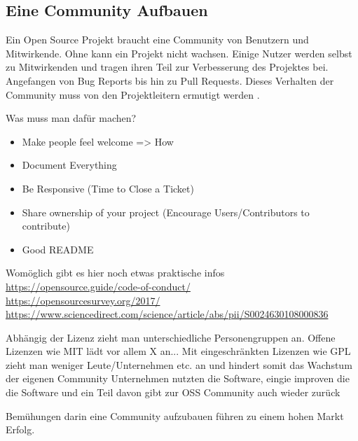 \subsection{Eine Community Aufbauen} \label{ssec:Eine Community Aufbauen}




\noindent
Ein Open Source Projekt braucht eine Community von Benutzern und Mitwirkende. Ohne kann ein Projekt
nicht wachsen. Einige Nutzer werden selbst zu Mitwirkenden und tragen ihren Teil zur Verbesserung
des Projektes bei. Angefangen von Bug Reports bis hin zu Pull Requests. Dieses Verhalten der Community
muss von den Projektleitern ermutigt werden
\cite{bangerthWhatMakesComputational2013,GitHubBuildingWelcomingCommunities2022}.

\bigskip
\noindent
Was muss man dafür machen?

\begin{itemize}
    \item Make people feel welcome => How
    \item Document Everything
    \item Be Responsive (Time to Close a Ticket)
    \item Share ownership of your project (Encourage Users/Contributors to contribute)
    \item Good README
\end{itemize}

\bigskip
\noindent
Womöglich gibt es hier noch etwas praktische infos \\
\url{https://opensource.guide/code-of-conduct/} \\
\url{https://opensourcesurvey.org/2017/} \\
\url{https://www.sciencedirect.com/science/article/abs/pii/S0024630108000836} \\
\cite{midhaFactorsAffectingSuccess2012}

\bigskip

Abhängig der Lizenz zieht man unterschiedliche Personengruppen an.
Offene Lizenzen wie MIT lädt vor allem X an...
Mit eingeschränkten Lizenzen wie GPL zieht man weniger Leute/Unternehmen etc. an und hindert
somit das Wachstum der eigenen Community 
%
Unternehmen nutzten die Software,
eingie improven die die Software und ein Teil davon gibt zur OSS Community auch wieder zurück
\cite{bangerthWhatMakesComputational2013} %



\begin{hypothesis}
    Bemühungen darin eine Community aufzubauen führen zu einem hohen Markt Erfolg.
\end{hypothesis}